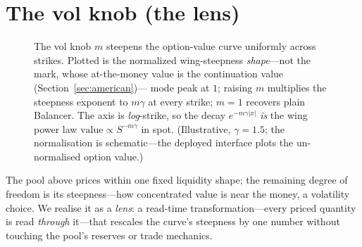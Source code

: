 \documentclass[runningheads]{llncs}
\begin{document}
\section{The vol knob (the lens)}\label{sec:lens}

\begin{figure}[t]
\centering
{}
\caption{The vol knob $m$ steepens the option-value curve uniformly across
strikes. Plotted is the normalized wing-steepness \emph{shape}---not the mark,
whose at-the-money value is the continuation value (Section~\ref{sec:american})---%
mode peak at $1$; raising $m$ multiplies the steepness exponent to $m\gamma$ at
every strike; $m=1$ recovers plain Balancer. The axis is \emph{log}-strike, so the
decay $e^{-m\gamma|x|}$ \emph{is} the wing power law
$\mathrm{value}\propto S^{-m\gamma}$ in spot. (Illustrative, $\gamma=1.5$; the
normalisation is schematic---the deployed interface plots the un-normalised
option value.)}
\label{fig:lens}
\end{figure}

The pool above prices within one fixed liquidity shape; the remaining degree of
freedom is its steepness---how concentrated value is near the money, a volatility
choice. We realise it as a \emph{lens}: a read-time transformation---every priced
quantity is read \emph{through} it---that rescales the curve's steepness by one
number without touching the pool's reserves or trade mechanics.
\end{document}

